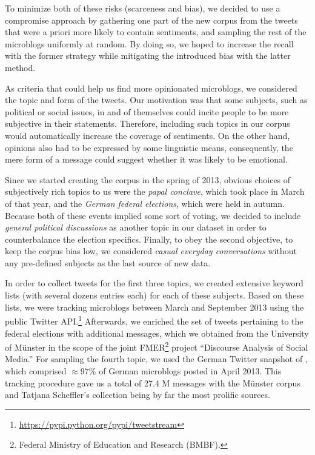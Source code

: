 To minimize both of these risks (scarceness and bias), we decided to
use a compromise approach by gathering one part of the new corpus from
the tweets that were a priori more likely to contain sentiments, and
sampling the rest of the microblogs uniformly at random.  By doing so,
we hoped to increase the recall with the former strategy while
mitigating the introduced bias with the latter method.

As criteria that could help us find more opinionated microblogs, we
considered the topic and form of the tweets.  Our motivation was that
some subjects, such as political or social issues, in and of
themselves could incite people to be more subjective in their
statements.  Therefore, including such topics in our corpus would
automatically increase the coverage of sentiments.  On the other hand,
opinions also had to be expressed by some linguistic means,
consequently, the mere form of a message could suggest whether it was
likely to be emotional.

Since we started creating the corpus in the spring of 2013, obvious
choices of subjectively rich topics to us were the \emph{papal
  conclave}, which took place in March of that year, and the
\emph{German federal elections}, which were held in autumn.  Because
both of these events implied some sort of voting, we decided to
include \emph{general political discussions} as another topic in our
dataset in order to counterbalance the election specifics.  Finally,
to obey the second objective, \ie{} to keep the corpus bias low, we
considered \emph{casual everyday conversations} without any
pre-defined subjects as the last source of new data.

In order to collect tweets for the first three topics, we created
extensive keyword lists (with several dozens entries each) for each of
these subjects.  Based on these lists, we were tracking microblogs
between March and September 2013 using the public Twitter
API.\footnote{\url{https://pypi.python.org/pypi/tweetstream}}
Afterwards, we enriched the set of tweets pertaining to the federal
elections with additional messages, which we obtained from the
University of M\"unster in the scope of the joint
FMER\footnote{Federal Ministry of Education and Research (BMBF).}
project ``Discourse Analysis of Social Media.''  For sampling the
fourth topic, we used the German Twitter snapshot of
\citet{Scheffler:14}, which comprised $\approx97\%$ of German
microblogs posted in April 2013.  This tracking procedure gave us a
total of 27.4 M messages with the M\"unster corpus and Tatjana
Scheffler's collection being by far the most prolific sources.

